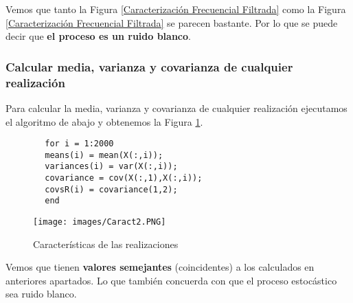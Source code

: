 \documentclass[a4paper, fontsize=11pt]{scrartcl} %
\numberwithin{equation}{section} %
\numberwithin{figure}{section} %
\numberwithin{table}{section} %
\begin{document}
	Vemos que tanto la Figura \ref{Caracterización Frecuencial Filtrada} como la Figura \ref{Caracterización Frecuencial Filtrada} se parecen bastante. Por lo que se puede decir que \textbf{el proceso es un ruido blanco}.
	
	\subsubsection{Calcular media, varianza y covarianza de cualquier realización}
	
	Para calcular la media, varianza y covarianza de cualquier realización ejecutamos  el algoritmo de abajo y obtenemos la Figura \ref{Características de las realizaciones}.
	
	\begin{lstlisting}
		for i = 1:2000
		means(i) = mean(X(:,i));
		variances(i) = var(X(:,i));
		covariance = cov(X(:,1),X(:,i));
		covsR(i) = covariance(1,2);
		end
	\end{lstlisting}
	
	\begin{figure}[h!]
		\centering
		\texttt{[image: images/Caract2.PNG]}
		\caption{Características de las realizaciones}
		\label{Características de las realizaciones}
	\end{figure}
	\FloatBarrier
	
	Vemos que tienen \textbf{valores semejantes} (coincidentes) a los calculados en anteriores apartados. Lo que también concuerda con que el proceso estocástico sea ruido blanco.
	
\end{document}
